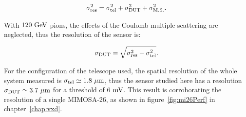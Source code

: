       \begin{equation}
        \sigma_{\rm{res}}^2 = \sigma_{\rm{tel}}^2 + \sigma_{\rm{DUT}}^2 + \sigma_{\rm{M.S.}}^2.
        \label{eq:pointingResolution}
      \end{equation}

      With $120~\rm{GeV}$ pions, the effects of the Coulomb multiple scattering are neglected, thus the resolution of the sensor is:

      \begin{equation}
        \sigma_{\rm{DUT}} = \sqrt{\sigma_{\rm{res}}^2 - \sigma_{\rm{tel}}^2}.
      \end{equation}

      For the configuration of the telescope used, the spatial resolution of the whole system measured is $\sigma_{\rm{tel}} \simeq 1.8~\rm{\mu m}$, thus the sensor studied here has a resolution $\sigma_{\rm{DUT}} \simeq 3.7~\rm{\mu m}$ for a threshold of $6~\rm{mV}$.
      This result is corroborating the resolution of a single MIMOSA-26, as shown in figure~\ref{fig:mi26Perf} in chapter~\ref{chap:vxd}.

